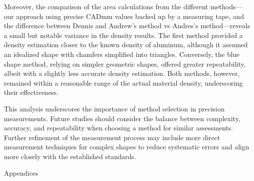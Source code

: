 \documentclass{article}
\begin{document}
Moreover, the comparison of the area calculations from the different methods—our approach using precise CADmm values backed up by a measuring tape, and the difference between Dennis and Andrew's method vs Andres's method—reveals a small but notable variance in the density results. The first method provided a density estimation closer to the known density of aluminum, although it assumed an idealized shape with chamfers simplified into triangles. Conversely, the blue shape method, relying on simpler geometric shapes, offered greater repeatability, albeit with a slightly less accurate density estimation. Both methods, however, remained within a reasonable range of the actual material density, underscoring their effectiveness.

This analysis underscores the importance of method selection in precision measurements. Future studies should consider the balance between complexity, accuracy, and repeatability when choosing a method for similar assessments. Further refinement of the measurement process may include more direct measurement techniques for complex shapes to reduce systematic errors and align more closely with the established standards.


\newpage
\thispagestyle{empty}  %
\begin{center}
	\vspace*{\fill}
	{\Huge Appendices}
	\vspace*{\fill}
\end{center}
\end{document}
